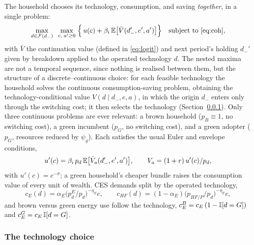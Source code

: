 The household chooses its technology, consumption, and saving \emph{together}, in a
single problem:
%
\begin{equation}
\max_{d\in\mathcal F(d_-)}\;\;\max_{c,\;a'\ge0}\;
\Bigl\{\,u(c)+\beta_i\,\mathbb{E}\bigl[\bar V(d_-',e',a')\bigr]\Bigr\}
\quad\text{subject to \eqref{eq:coh}},
\label{eq:joint}
\end{equation}
%
with $\bar V$ the continuation value (defined in \eqref{eq:logit}) and next period's
holding $d_-'$ given by breakdown applied to the operated technology $d$. The nested
maxima are not a temporal sequence, since nothing is realised between them, but the
structure of a discrete--continuous choice: for each feasible technology the
household solves the continuous consumption-saving problem, obtaining the
technology-conditional value $V(d\mid d_-,e, a)$, in which the origin $d_-$ enters
only through the switching cost; it then selects the technology
(Section~\ref{sec:adoption}). Only three
continuous problems are ever relevant: a brown household ($p_B\equiv1$, no switching
cost), a green incumbent ($p_G$, no switching cost), and a green adopter ($p_G$,
resources reduced by $\psi_g$). Each satisfies the usual Euler and envelope
conditions,
%
\begin{equation}
u'(c)=\beta_i\,p_d\,\mathbb{E}\bigl[\bar V_a(d_-',e',a')\bigr],
\qquad
V_a=(1+r)\,u'(c)/p_d,
\label{eq:euler}
\end{equation}
%
with $u'(c)=c^{-\sigma}$; a green household's cheaper bundle raises the
consumption value of every unit of wealth. CES demands split by the operated
technology,
%
\begin{equation}
c_E(d)=\alpha_E\bigl(p^E_d/p_d\bigr)^{-\eta_E}c,
\qquad
c_{HF}(d)=(1-\alpha_E)\bigl(p_{HF/P}/p_d\bigr)^{-\eta_E}c,
\label{eq:hh-demands}
\end{equation}
%
and brown versus green energy use follow the technology,
$c^B_E=c_E\,(1-\mathbb{I}[d=G])$ and $c^G_E=c_E\,\mathbb{I}[d=G]$.

\subsubsection{The technology choice}\label{sec:adoption}

